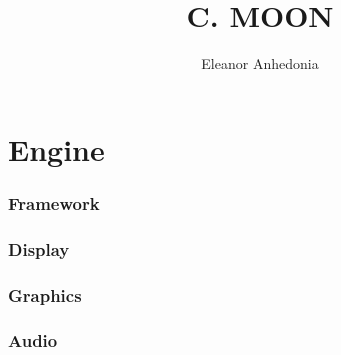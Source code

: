 \documentclass[]{cmoon}
\title{C. MOON}
\author{Eleanor Anhedonia}
\begin{document}
\maketitle
\tableofcontents

\part{Engine}
\section{Framework}


\section{Display}


\section{Graphics}


\section{Audio}

\end{document}
